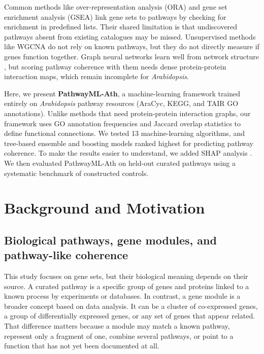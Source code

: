 \documentclass[12pt,letterpaper,oneside,openany]{book}
\begin{document}
Common methods like over-representation analysis (ORA) and gene set enrichment analysis (GSEA) \citep{subramanian2005gsea,khatri2012ten} link gene sets to pathways by checking for enrichment in predefined lists. Their shared limitation is that undiscovered pathways absent from existing catalogues may be missed. Unsupervised methods like WGCNA \citep{langfelder2008wgcna,liesecke2018ranking} do not rely on known pathways, but they do not directly measure if genes function together. Graph neural networks learn well from network structure \citep{muzio2021biological}, but scoring pathway coherence with them needs dense protein-protein interaction maps, which remain incomplete for \textit{Arabidopsis}.


Here, we present \textbf{PathwayML-Ath}, a machine-learning framework trained entirely on \textit{Arabidopsis} pathway resources (AraCyc, KEGG, and TAIR GO annotations). Unlike methods that need protein-protein interaction graphs, our framework uses GO annotation frequencies and Jaccard overlap statistics to define functional connections. We tested 13 machine-learning algorithms, and tree-based ensemble and boosting models ranked highest for predicting pathway coherence. To make the results easier to understand, we added SHAP analysis \citep{lundberg2017unified,strudwick2025autoxai4omics}. We then evaluated PathwayML-Ath on held-out curated pathways using a systematic benchmark of constructed controls.




\chapter{Background and Motivation}
\label{sec:background_motivation}

\section{Biological pathways, gene modules, and pathway-like coherence}
\label{sec:bg_pathways_modules}

This study focuses on gene sets, but their biological meaning depends on their source. A curated pathway is a specific group of genes and proteins linked to a known process by experiments or databases. In contrast, a gene module is a broader concept based on data analysis. It can be a cluster of co-expressed genes, a group of differentially expressed genes, or any set of genes that appear related. That difference matters because a module may match a known pathway, represent only a fragment of one, combine several pathways, or point to a function that has not yet been documented at all.
\end{document}
